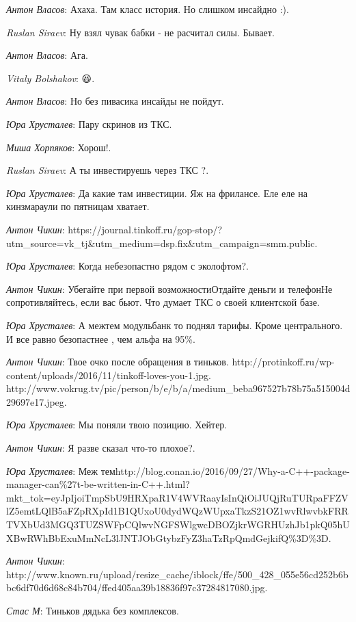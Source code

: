 \documentclass[10pt]{book}
\newcommand{\AUTHOR}[1]{\emph{#1}:}
\begin{document}
\AUTHOR{Антон Власов} Ахаха. Там класс история. Но слишком инсайдно :).

\AUTHOR{Ruslan Siraev} Ну взял чувак бабки - не расчитал силы. Бывает.

\AUTHOR{Антон Власов} Ага.

\AUTHOR{Vitaly Bolshakov} 😆.

\AUTHOR{Антон Власов}  Но без пивасика инсайды не пойдут.

\AUTHOR{Юра Хрусталев} Пару скринов из ТКС.

\AUTHOR{Миша Хорпяков} Хорош!.

\AUTHOR{Ruslan Siraev} А ты инвестируешь через ТКС ?.

\AUTHOR{Юра Хрусталев} Да какие там инвестиции. Яж на фрилансе. Еле еле на кинзмараули по пятницам хватает.

\AUTHOR{Антон Чикин} https://journal.tinkoff.ru/gop-stop/?utm_source=vk_tj&utm_medium=dsp.fix&utm_campaign=smm.public.

\AUTHOR{Юра Хрусталев} Когда небезопастно рядом с эколофтом?.

\AUTHOR{Антон Чикин} Убегайте при первой возможностиОтдайте деньги и телефонНе сопротивляйтесь, если вас бьют. Что думает ТКС о своей клиентской базе.

\AUTHOR{Юра Хрусталев} А межтем модульбанк то поднял тарифы. Кроме центрального. И все равно безопастнее , чем альфа на 95\%.

\AUTHOR{Антон Чикин} Твое очко после обращения в тиньков. http://protinkoff.ru/wp-content/uploads/2016/11/tinkoff-loves-you-1.jpg. http://www.vokrug.tv/pic/person/b/e/b/a/medium_beba967527b78b75a515004d29697e17.jpeg.

\AUTHOR{Юра Хрусталев} Мы поняли твою позицию. Хейтер.

\AUTHOR{Антон Чикин} Я разве сказал что-то плохое?.

\AUTHOR{Юра Хрусталев} Меж темhttp://blog.conan.io/2016/09/27/Why-a-C++-package-manager-can\%27t-be-written-in-C++.html?mkt_tok=eyJpIjoiTmpSbU9HRXpaR1V4WVRaayIsInQiOiJUQjRuTURpaFFZVlZ5emtLQlB5aFZpRXpId1B1QUxoU0dydWQzWUpxaTkzS21OZ1wvRlwvbkFRRTVXbUd3MGQ3TUZSWFpCQlwvNGFSWlgwcDBOZjkrWGRHUzhJb1pkQ05hUXBwRWhBbExuMmNcL3lJNTJObGtybzFyZ3haTzRpQmdGejkifQ\%3D\%3D.

\AUTHOR{Антон Чикин} http://www.known.ru/upload/resize_cache/iblock/ffe/500_428_055e56cd252b6bbc6df70d6d68c84b704/ffed405aa39b18836f97c37284817080.jpg.

\AUTHOR{Стас М} Тиньков дядька без комплексов.
\end{document}

